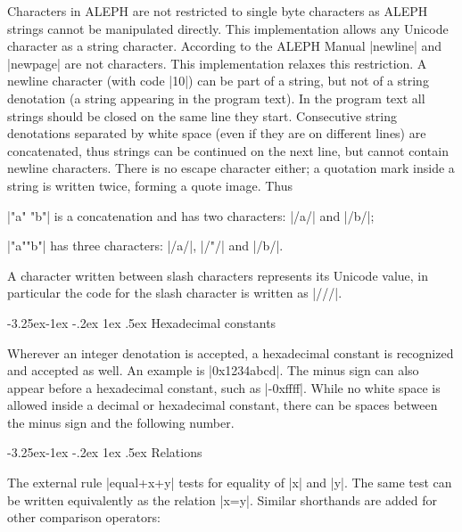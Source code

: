 \documentclass[titlepage]{article}
\makeatletter
\newcommand\A{\textsf{ALEPH}}
\newcommand\g[1]{\textsf{\color{blue!90!black}#1}}
\renewcommand\subsection{%
\@startsection{subsection}{2}{\z@}%
   {-3.25ex\@plus -1ex \@minus -.2ex}%
   {1ex \@plus .5ex}%
   {\normalfont\normalsize\bfseries}}
\makeatother
\begin{document}
Characters in \A{} are not restricted to single byte characters as
\A{} strings cannot be manipulated directly. This implementation allows any
Unicode character as a string character. According to the \A{} Manual
\pp|newline| and \pp|newpage| are not characters. This implementation
relaxes this restriction. A newline character (with code \pp|10|) can be
part of a string, but not of a \g{string denotation} (a string appearing in
the program text). In the program text all strings should be closed on the
same line they start. Consecutive string denotations separated by white
space (even if they are on
different lines) are concatenated, thus strings can be continued on the next
line, but cannot contain newline characters. There is no escape character
either; a quotation mark inside a string is written twice, forming a
\g{quote image}. Thus

\smallskip

\HH\pp|"a" "b"| \HE is a concatenation and has two characters: \pp|/a/| and
\pp|/b/|;

\HH\pp|"a""b"|  \HE has three characters: \pp|/a/|, \pp|/"/| and \pp|/b/|.

\smallskip
\noindent
A character written between slash characters represents its Unicode value,
in particular the code for the slash character is written as \pp|///|.
 

\subsection{Hexadecimal constants}

Wherever an \g{integer denotation} is accepted, a hexadecimal constant is
recognized and accepted as well. An example is \pp|0x1234abcd|. The
minus sign can also appear before a hexadecimal constant, such as \pp|-0xffff|.
While no white space is allowed inside a decimal or hexadecimal constant, 
there can be spaces between the minus sign and the following number.


\subsection{Relations}\label{subsec:relations}

The external rule \pp|equal+x+y| tests for equality of \pp|x| and \pp|y|.
The same test can be written equivalently as the \g{relation} \pp|x=y|.
Similar shorthands are added for other comparison operators:
\end{document}
